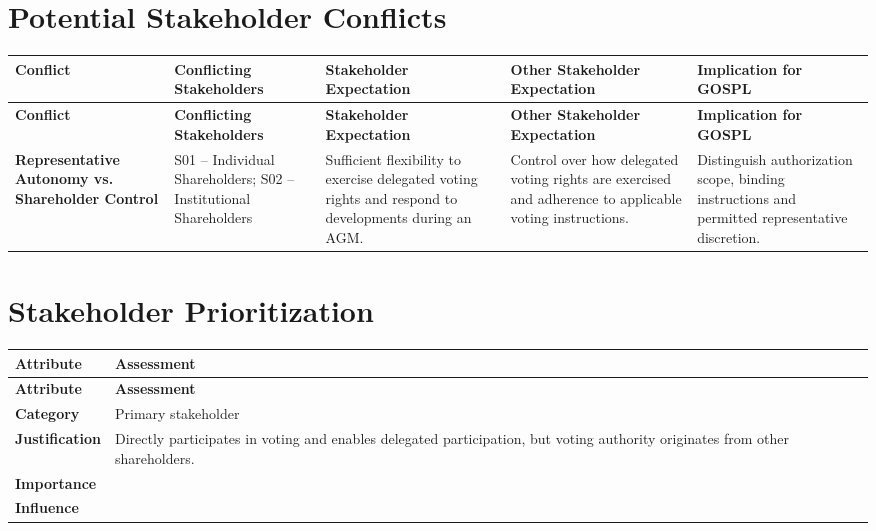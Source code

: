 \documentclass[11pt,a4paper]{article}
\begin{document}

\section*{Potential Stakeholder Conflicts}

\begingroup\small
\begin{longtable}{@{}>{\raggedright\arraybackslash}p{}>{\raggedright\arraybackslash}p{}>{\raggedright\arraybackslash}p{}>{\raggedright\arraybackslash}p{}>{\raggedright\arraybackslash}p{}@{}}
\toprule
\textbf{Conflict} & \textbf{Conflicting Stakeholders} & \textbf{Stakeholder Expectation} & \textbf{Other Stakeholder Expectation} & \textbf{Implication for GOSPL} \\
\midrule
\endfirsthead
\toprule
\textbf{Conflict} & \textbf{Conflicting Stakeholders} & \textbf{Stakeholder Expectation} & \textbf{Other Stakeholder Expectation} & \textbf{Implication for GOSPL} \\
\midrule
\endhead
\bottomrule
\endfoot
\textbf{Representative Autonomy vs. Shareholder Control} & S01 -- Individual Shareholders; S02 -- Institutional Shareholders & Sufficient flexibility to exercise delegated voting rights and respond to developments during an AGM. & Control over how delegated voting rights are exercised and adherence to applicable voting instructions. & Distinguish authorization scope, binding instructions and permitted representative discretion. \\
\end{longtable}
\endgroup


\section*{Stakeholder Prioritization}

\begingroup\small
\begin{longtable}{@{}>{\raggedright\arraybackslash}p{}>{\raggedright\arraybackslash}p{}@{}}
\toprule
\textbf{Attribute} & \textbf{Assessment} \\
\midrule
\endfirsthead
\toprule
\textbf{Attribute} & \textbf{Assessment} \\
\midrule
\endhead
\bottomrule
\endfoot
\textbf{Category} & Primary stakeholder \\
\addlinespace
\textbf{Justification} & Directly participates in voting and enables delegated participation, but voting authority originates from other shareholders. \\
\addlinespace
\textbf{Importance} & 4 \\
\addlinespace
\textbf{Influence} & 3 \\
\end{longtable}
\endgroup
\end{document}
